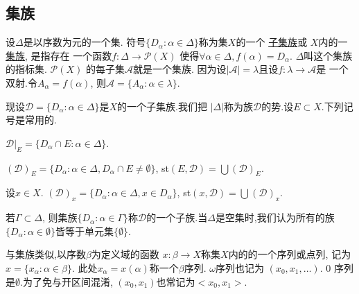 \documentclass[main.tex]{subfiles}
\begin{document}
\subsection{集族}\label{subsec:1.1.1}

设$\Delta$是以序数为元的一个集.
符号$\{D_\alpha : \alpha\in\Delta\}$称为集$X$的一个
\underline{子集族}或
$X$内的一\underline{集族}, 是指存在
一个函数$f:\Delta \to \mathscr{P}(X)$
使得$\forall \alpha \in \Delta, f(\alpha)=D_\alpha$.
$\Delta$叫这个集族的指标集. $\mathscr{P}(X)$
的每子集$\mathscr{A}$就是一个集族.
因为设$|\mathscr{A}|=\lambda$且设$f: \lambda\to \mathscr{A}$是
一个双射.令$A_\alpha = f(\alpha)$, 则$\mathscr{A}=\{A_\alpha:\alpha\in\lambda\}$.

现设$\mathscr{D}=\{D_\alpha:\alpha\in\Delta\}$是$X$的一个子集族.我们把
$|\Delta|$称为族$\mathscr{D}$的势.设$E\subset X$.下列记号是常用的.

$\mathscr{D}|_E= \{D_\alpha\cap E: \alpha\in\Delta\}$.

$(\mathscr{D})_E= \{D_\alpha: \alpha\in\Delta, D_\alpha\cap E \ne\emptyset\}$,
st$(E, \mathscr{D}) = \bigcup(\mathscr{D})_E$.

设$x\in X$. $(\mathscr{D})_x= \{D_\alpha: \alpha\in\Delta, x\in D_\alpha\}$,
st$(x, \mathscr{D}) = \bigcup(\mathscr{D})_x$.

若$\Gamma\subset\Delta$, 则集族$\{D_\alpha : \alpha\in\Gamma\}$称$\mathscr{D}$的一个子族.当$\Delta$是空集时,我们认为所有的族$\{D_\alpha : \alpha\in\emptyset\}$皆等于单元集$\{\emptyset\}$.

与集族类似,以序数$\beta$为定义域的函数
$x: \beta\to X$称集$X$内的的一个序列或点列, 记为$x=\{x_\alpha : \alpha\in\beta\}$.
此处$x_\alpha=x(\alpha)$称一个$\beta$序列. $\omega$序列也记为
$(x_0, x_1, \dots)$. 0 序列是$\emptyset$.为了免与开区间混淆, $(x_0, x_1)$也常记为$<x_0, x_1>$.

\end{document}
